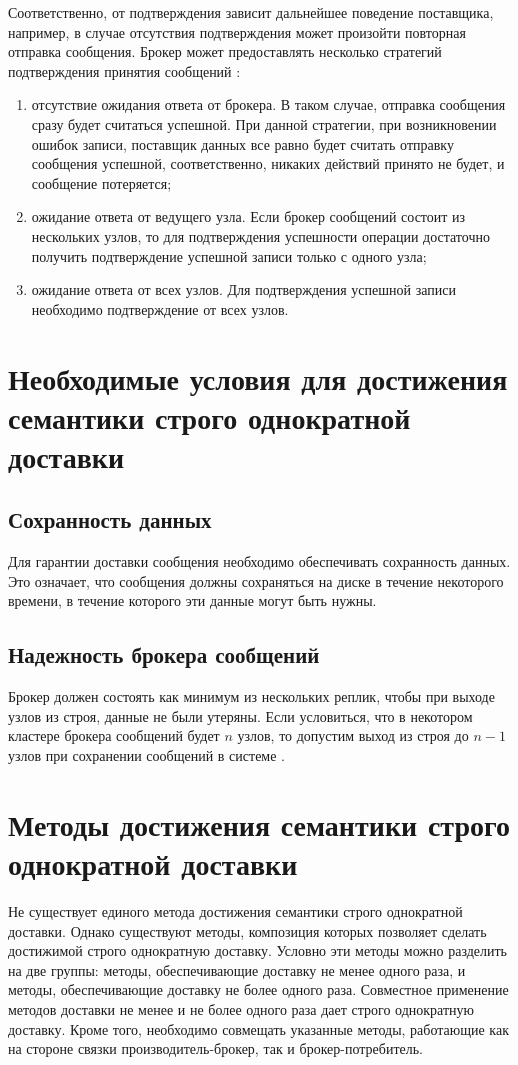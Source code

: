 Соответственно, от подтверждения зависит дальнейшее поведение поставщика, например, в случае отсутствия подтверждения может произойти повторная отправка сообщения. 
Брокер может предоставлять несколько стратегий подтверждения принятия сообщений \cite{bib:8}:

\begin{enumerate}
	\item отсутствие ожидания ответа от брокера. В таком случае, отправка сообщения сразу будет считаться успешной. При данной стратегии, при возникновении ошибок записи, поставщик данных все равно будет считать отправку сообщения успешной, соответственно, никаких действий принято не будет, и сообщение потеряется;
	\item ожидание ответа от ведущего узла. Если брокер сообщений состоит из нескольких узлов, то для подтверждения успешности операции достаточно получить подтверждение успешной записи только с одного узла;
	\item ожидание ответа от всех узлов. Для подтверждения успешной записи необходимо подтверждение от всех узлов.
\end{enumerate}

\section{Необходимые условия для достижения семантики строго однократной доставки}
\label{section:need_semantics}
\subsection{Сохранность данных}

Для гарантии доставки сообщения необходимо обеспечивать сохранность данных. 
Это означает, что сообщения должны сохраняться на диске в течение некоторого времени, в течение которого эти данные могут быть нужны.

\subsection{Надежность брокера сообщений}
Брокер должен состоять как минимум из нескольких реплик, чтобы при выходе узлов из строя, данные не были утеряны. 
Если условиться, что в некотором кластере брокера сообщений будет $n$ узлов, то допустим выход из строя до $n-1$ узлов при сохранении сообщений в системе \cite{bib:4}.

\section{Методы достижения семантики строго однократной доставки}
Не существует единого метода достижения семантики строго однократной доставки. Однако существуют методы, композиция которых позволяет сделать достижимой строго однократную доставку. Условно эти методы можно разделить на две группы: методы, обеспечивающие доставку не менее одного раза, и методы, обеспечивающие доставку не более одного раза. Совместное применение методов доставки не менее и не более одного раза дает строго однократную доставку. Кроме того, необходимо совмещать указанные методы, работающие как на стороне связки производитель-брокер, так и брокер-потребитель.

